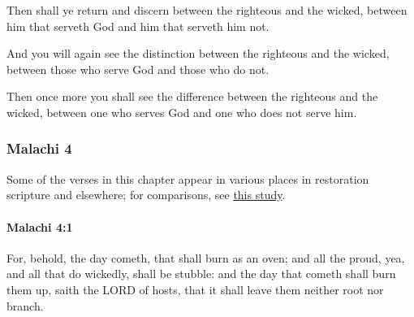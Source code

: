 			\begin{versebox}
					\item[BHS] 
					\item[LXX] 
					\item[ASV] Then shall ye return and discern between the righteous and the wicked, between him that serveth God and him that serveth him not.
					\item[NIV] And you will again see the distinction between the righteous and the wicked, between those who serve God and those who do not.
					\item[NRSV] Then once more you shall see the difference between the righteous and the wicked, between one who serves God and one who does not serve him.
			\end{versebox}

	\subsubsection{Malachi 4} %
		\label{MALACHI-4}
		
		Some of the verses in this chapter appear in various places in restoration scripture and elsewhere; for comparisons, see \hyperref[EXSS-OT-MALACHI-4-VERSIONS]{this study}.
		
		\paragraph{Malachi 4:1} %
			\label{MALACHI-4-1}

			For, behold, the day cometh, that shall burn as an oven; and all the proud, yea, and all that do wickedly, shall be stubble: and the day that cometh shall burn them up, saith the LORD of hosts, that it shall leave them neither root nor branch.

